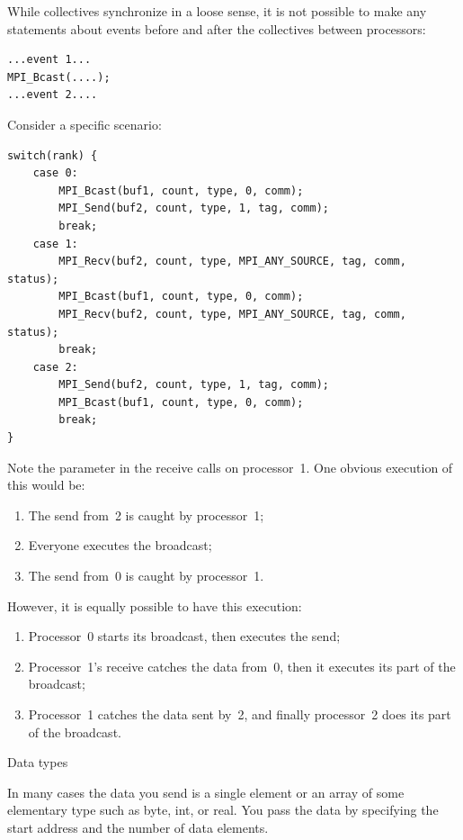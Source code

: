 While collectives synchronize in a loose sense, it is not possible to
make any statements about events before and after the collectives
between processors:
\begin{verbatim}
...event 1...
MPI_Bcast(....);
...event 2....
\end{verbatim}
Consider a specific scenario:
\begin{verbatim}
switch(rank) { 
    case 0: 
        MPI_Bcast(buf1, count, type, 0, comm); 
        MPI_Send(buf2, count, type, 1, tag, comm); 
        break; 
    case 1: 
        MPI_Recv(buf2, count, type, MPI_ANY_SOURCE, tag, comm, status); 
        MPI_Bcast(buf1, count, type, 0, comm); 
        MPI_Recv(buf2, count, type, MPI_ANY_SOURCE, tag, comm, status); 
        break; 
    case 2: 
        MPI_Send(buf2, count, type, 1, tag, comm); 
        MPI_Bcast(buf1, count, type, 0, comm); 
        break; 
}
\end{verbatim}
Note the  parameter in the receive calls on processor~1.
One obvious execution of this would be:
\begin{enumerate}
\item The send from~2 is caught by processor~1;
\item Everyone executes the broadcast;
\item The send from~0 is caught by processor~1.
\end{enumerate}
However, it is equally possible to have this execution:
\begin{enumerate}
\item Processor~0 starts its broadcast, then executes the send;
\item Processor~1's receive catches the data from~0, then it executes
  its part of the broadcast;
\item Processor~1 catches the data sent by~2, and finally processor~2
  does its part of the broadcast.
\end{enumerate}


 {Data types}

In many cases the data you send is a single element or an array of some 
elementary type such as byte, int, or real. You pass the data by specifying
the start address and the number of data elements.


